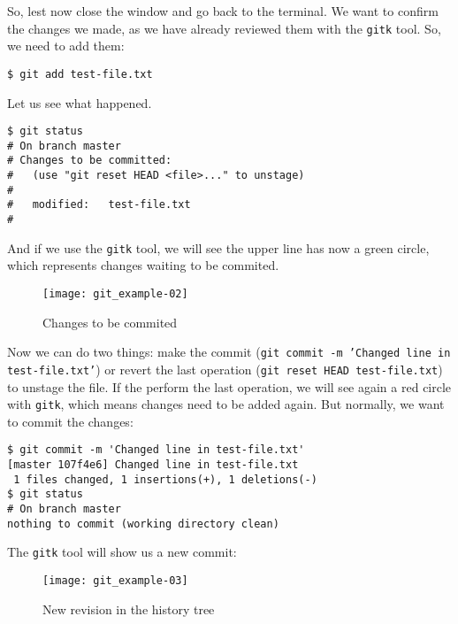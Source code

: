 \documentclass[a4paper,10pt]{article}
\newenvironment{terminal}
  {
    \vspace{+10pt}
    \begin{center}
    \begin{minipage}{0.95\textwidth}
    \begin{framed}
  }
  {
    \end{framed}
    \end{minipage}
    \end{center}
    \vspace{+10pt}
  }
\begin{document}
So, lest now close the window and go back to the terminal. We want to
confirm the changes we made, as we have already reviewed them with the
\texttt{gitk} tool. So, we need to add them:

\begin{terminal}
\begin{verbatim}
$ git add test-file.txt
\end{verbatim}
\end{terminal}

Let us see what happened.

\begin{terminal}
\begin{verbatim}
$ git status
# On branch master
# Changes to be committed:
#   (use "git reset HEAD <file>..." to unstage)
#
#	modified:   test-file.txt
#
\end{verbatim}
\end{terminal}

And if we use the \texttt{gitk} tool, we will see the upper line has now
a green circle, which represents changes waiting to be commited.

\begin{figure}
  \begin{center}
    \texttt{[image: git\_example-02]}
  \end{center}
  \caption{Changes to be commited}
\end{figure}

Now we can do two things: make the commit (\texttt{git commit -m
'Changed line in test-file.txt'}) or revert the last operation
(\texttt{git reset HEAD test-file.txt}) to unstage the file. If the
perform the last operation, we will see again a red circle with
\texttt{gitk}, which means changes need to be added again. But normally,
we want to commit the changes:

\begin{terminal}
\begin{verbatim}
$ git commit -m 'Changed line in test-file.txt'
[master 107f4e6] Changed line in test-file.txt
 1 files changed, 1 insertions(+), 1 deletions(-)
$ git status
# On branch master
nothing to commit (working directory clean)
\end{verbatim}
\end{terminal}

The \texttt{gitk} tool will show us a new commit:

\begin{figure}
  \begin{center}
    \texttt{[image: git\_example-03]}
  \end{center}
  \caption{New revision in the history tree}
\end{figure}
\end{document}
